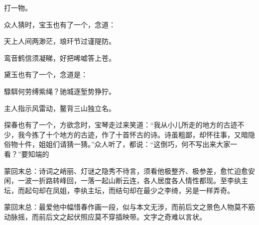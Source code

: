 \begin{parag}
    打一物。
\end{parag}


\begin{parag}
    众人猜时，宝玉也有了一个，念道：
\end{parag}


\begin{poem}
    \begin{pl}天上人间两渺茫，琅玕节过谨隄防。\end{pl}

    \begin{pl}鸾音鹤信须凝睇，好把唏嘘答上苍。\end{pl}

\end{poem}


\begin{parag}
    黛玉也有了一个，念道是：
\end{parag}


\begin{poem}
    \begin{pl}騄駬何劳缚紫绳？驰城逐堑势狰狞。\end{pl}

    \begin{pl}主人指示风雷动，鳌背三山独立名。\end{pl}

\end{poem}


\begin{parag}
    探春也有了一个，方欲念时，宝琴走过来笑道：“我从小儿所走的地方的古迹不少，我今拣了十个地方的古迹，作了十首怀古的诗。诗虽粗鄙，却怀往事，又暗隐俗物十件，姐姐们请猜一猜。”众人听了，都说：“这倒巧，何不写出来大家一看？”要知端的
\end{parag}


\begin{parag}
    \begin{note}蒙回末总：诗词之峭丽、灯谜之隐秀不待言，须看他极整齐、极参差，愈忙迫愈安闲，一波一折路转峰回，一落一起山断云连，各人居度各人情性都现。至李纨主坛，而起句却在凤姐，李纨主坛，而结句却在最少之李绮，另是一样弄奇。\end{note}
\end{parag}


\begin{parag}
    \begin{note}蒙回末总：最爱他中幅惜春作画一段，似与本文无涉，而前后文之景色人物莫不筋动脉摇，而前后文之起伏照应莫不穿插映带。文字之奇难以言状。\end{note}
\end{parag}

